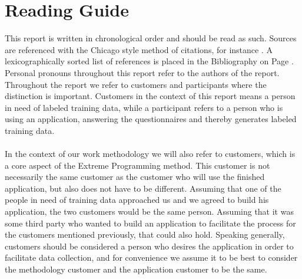 
\section*{Reading Guide}

This report is written in chronological order and should be read as such. Sources are referenced with the Chicago style method of citations, for instance \parencite{android_adb}. A lexicographically sorted list of references is placed in the Bibliography on Page \pageref{bibliografi}. Personal pronouns throughout this report refer to the authors of the report. Throughout the report we refer to customers and participants where the distinction is important. Customers in the context of this report means a person in need of labeled training data, while a participant refers to a person who is using an application, answering the questionnaires and thereby generates labeled training data. 
\\\\
In the context of our work methodology we will also refer to customers, which is a core aspect of the Extreme Programming method. This customer is not necessarily the same customer as the customer who will use the finished application, but also does not have to be different. Assuming that one of the people in need of training data approached us and we agreed to build his application, the two customers would be the same person. Assuming that it was some third party who wanted to build an application to facilitate the process for the customers mentioned previously, that could also hold. Speaking generally, customers should be considered a person who desires the application in order to facilitate data collection, and for convenience we assume it to be best to consider the methodology customer and the application customer to be the same. 